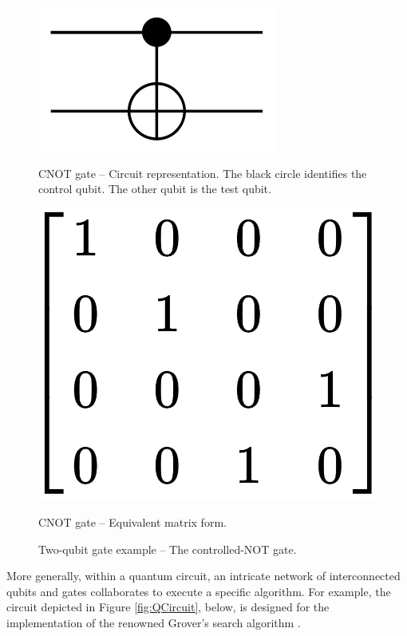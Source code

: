 \begin{figure}[htbp]
  \centering
  \begin{minipage}[t]{0.45\textwidth}
      \centering
      \includegraphics[width=.75\textwidth]{Figures/Diagrams/CNOT_Gate.png}
      \caption{CNOT gate – Circuit representation. The black circle identifies the control qubit. The other qubit is the test qubit.}
      \label{fig:CNOT_Gate}
  \end{minipage}
  \hfill
  \begin{minipage}[t]{0.45\textwidth}
      \centering
      \includegraphics[width=.50\textwidth]{Figures/Diagrams/CNOT_Matrix.png}
      \caption{CNOT gate – Equivalent matrix form.}
      \label{fig:CNOT_Matrix}
  \end{minipage}
  \caption{Two-qubit gate example – The controlled-NOT gate.}
  \label{fig:CNOT}
\end{figure}

More generally, within a quantum circuit, an intricate network of interconnected qubits and gates collaborates to execute a specific algorithm. For example, the circuit depicted in Figure \ref{fig:QCircuit}, below, is designed for the implementation of the renowned Grover's search algorithm \cite{Grover}.

